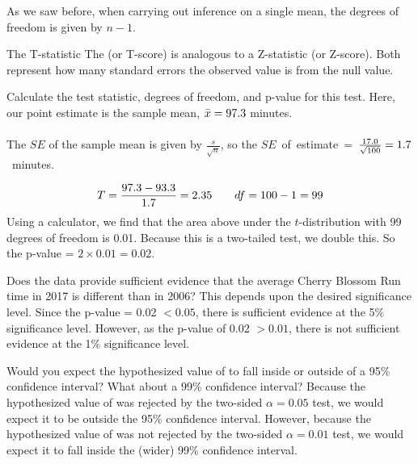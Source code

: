 As we saw before, when carrying out inference on a single mean, the degrees of freedom is given by $n-1$.  


\begin{onebox}{The T-statistic}
The  (or T-score) is analogous to a Z-statistic (or Z-score).  Both represent how many standard errors the observed value is from the null value.
\end{onebox}


\begin{examplewrap}
\begin{nexample}{Calculate the test statistic, degrees of freedom, and p-value for this test.}
Here, our point estimate is the sample mean, $\bar{x}=97.3{}$ minutes.  
\\
\\
The $SE$ of the sample mean is given by $\frac{s}{\sqrt{n}}$, so the \mbox{$SE$ of estimate = $\frac{17.0{}}{ \sqrt{100{}}} = 1.7{}$ minutes.}

\begin{align*}
 T = \frac{97.3{} - 93.3{}}{1.7{}} = 2.35{} \qquad df=100{}-1=99
\end{align*}
Using a calculator, we find that the area above \cherryblossomt{} under the $t$-distribution with 99 degrees of freedom is 0.01.  Because this is a two-tailed test, we double this.  So the p-value = $2\times 0.01 = 0.02.$
\end{nexample}
\end{examplewrap}

\begin{examplewrap}
\begin{nexample}{Does the data provide sufficient evidence that the average Cherry Blossom Run time in 2017 is different than in 2006?}
This depends upon the desired significance level.  Since the p-value = 0.02 $< 0.05$, there is sufficient evidence at the 5\% significance level.  However, as the p-value of 0.02 $> 0.01$, there is not sufficient evidence at the 1\% significance level.
\end{nexample}
\end{examplewrap}


\begin{examplewrap}
\begin{nexample}{Would you expect the hypothesized value of \cherryblossomnull{} to fall inside or outside of a 95\% confidence interval?  What about a 99\% confidence interval?} 
Because the hypothesized value of \cherryblossomnull{} was rejected by the two-sided $\alpha=0.05$ test, we would expect it to be outside the 95\% confidence interval.  However, because the hypothesized value of \cherryblossomnull{} was not rejected by the two-sided $\alpha=0.01$ test, we would expect it to fall inside the (wider) 99\% confidence interval.  
\end{nexample}
\end{examplewrap}


